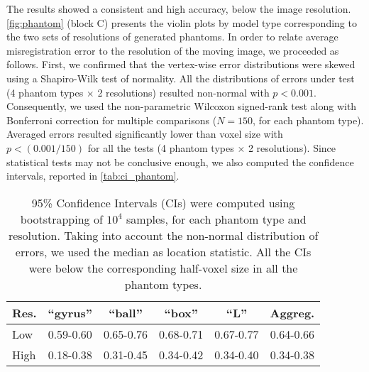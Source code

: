 The results showed a consistent and high accuracy, below the image resolution.
\autoref{fig:phantom} (block C) presents the violin plots by model type corresponding
  to the two sets of resolutions of generated phantoms.
In order to relate average misregistration error to the resolution of the moving image,
  we proceeded as follows.
First, we confirmed that the vertex-wise error distributions were skewed using a Shapiro-Wilk test of
  normality.
All the distributions of errors under test (4 phantom types $\times$ 2 resolutions) resulted
  non-normal with $p<0.001$.
Consequently, we used the non-parametric Wilcoxon signed-rank test along with Bonferroni
  correction for multiple comparisons ($N=150$, for each phantom type).
Averaged errors resulted significantly lower than voxel size with $p < (0.001 / 150)$
  for all the tests (4 phantom types $\times$ 2 resolutions).
Since statistical tests may not be conclusive enough, we also computed the confidence intervals,
  reported in \autoref{tab:ci_phantom}.


\begin{table}
		\centering
		\footnotesize
    \begin{tabular}{lccccc}
    Res. & ``gyrus'' & ``ball''  & ``box''   & ``L''     & Aggreg.    \\\hline
    Low  & 0.59-0.60 & 0.65-0.76 & 0.68-0.71 & 0.67-0.77 & 0.64-0.66  \\
    High & 0.18-0.38 & 0.31-0.45 & 0.34-0.42 & 0.34-0.40 & 0.34-0.38  \\
    \hline
    \end{tabular}
    \caption{95\% Confidence Intervals (CIs) were computed using bootstrapping of $10^4$ samples,
      for each phantom type and resolution.
    Taking into account the non-normal distribution of errors, we used the median as location
  		statistic.
    All the CIs were below the corresponding half-voxel size in all the phantom types.}\label{tab:ci_phantom}
\end{table}

